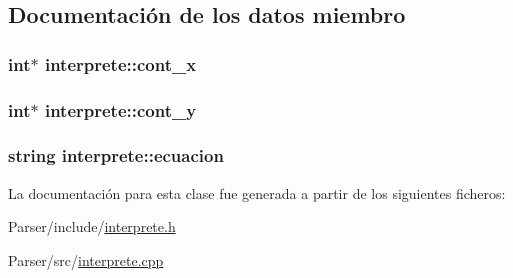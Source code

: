 \subsection{Documentación de los datos miembro}
\subsubsection[{\texorpdfstring{cont\+\_\+x}{cont_x}}]{\setlength{\rightskip}{0pt plus 5cm}int$\ast$ interprete\+::cont\+\_\+x}\hypertarget{classinterprete_a1a2c9c848bc7d438ada181325b9bd109}{}\label{classinterprete_a1a2c9c848bc7d438ada181325b9bd109}
\subsubsection[{\texorpdfstring{cont\+\_\+y}{cont_y}}]{\setlength{\rightskip}{0pt plus 5cm}int$\ast$ interprete\+::cont\+\_\+y}\hypertarget{classinterprete_a034d92459f0a0466cc717c08faaab481}{}\label{classinterprete_a034d92459f0a0466cc717c08faaab481}
\subsubsection[{\texorpdfstring{ecuacion}{ecuacion}}]{\setlength{\rightskip}{0pt plus 5cm}string interprete\+::ecuacion}\hypertarget{classinterprete_ab268b0d71f72cd82f186376c17444543}{}\label{classinterprete_ab268b0d71f72cd82f186376c17444543}


La documentación para esta clase fue generada a partir de los siguientes ficheros\+:\begin{DoxyCompactItemize}
\item 
Parser/include/\hyperlink{interprete_8h}{interprete.\+h}\item 
Parser/src/\hyperlink{interprete_8cpp}{interprete.\+cpp}\end{DoxyCompactItemize}
